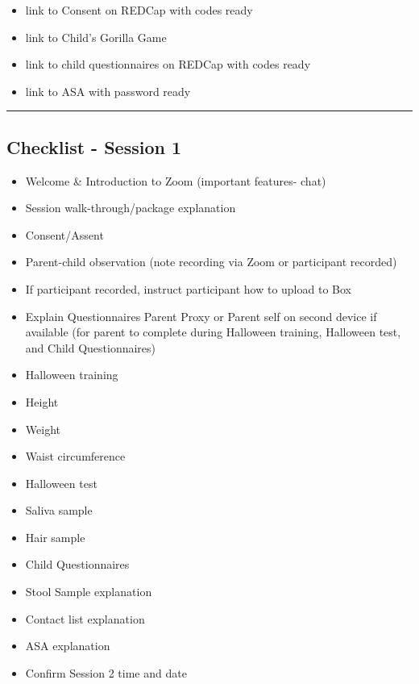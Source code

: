 \documentclass[]{book}
\providecommand{\tightlist}{%
  \setlength{\itemsep}{0pt}\setlength{\parskip}{0pt}}
\begin{document}
\begin{itemize}
  \begin{itemize}
  \tightlist
  \item
    link to Consent on REDCap with codes ready
  \item
    link to Child's Gorilla Game
  \item
    link to child questionnaires on REDCap with codes ready
  \item
    link to ASA with password ready
  \end{itemize}
\end{itemize}

\begin{center}\rule{0.5\linewidth}{0.5pt}\end{center}

\hypertarget{checklist---session-1-2}{%
\subsection{Checklist - Session 1}\label{checklist---session-1-2}}

\begin{itemize}
\tightlist
\item
  Welcome \& Introduction to Zoom (important features- chat)
\item
  Session walk-through/package explanation
\item
  Consent/Assent
\item
  Parent-child observation (note recording via Zoom or participant recorded)
\item
  If participant recorded, instruct participant how to upload to Box
\item
  Explain Questionnaires Parent Proxy or Parent self on second device if available (for parent to complete during Halloween training, Halloween test, and Child Questionnaires)
\item
  Halloween training
\item
  Height
\item
  Weight
\item
  Waist circumference
\item
  Halloween test
\item
  Saliva sample
\item
  Hair sample
\item
  Child Questionnaires
\item
  Stool Sample explanation
\item
  Contact list explanation
\item
  ASA explanation
\item
  Confirm Session 2 time and date
\end{itemize}
\end{document}
